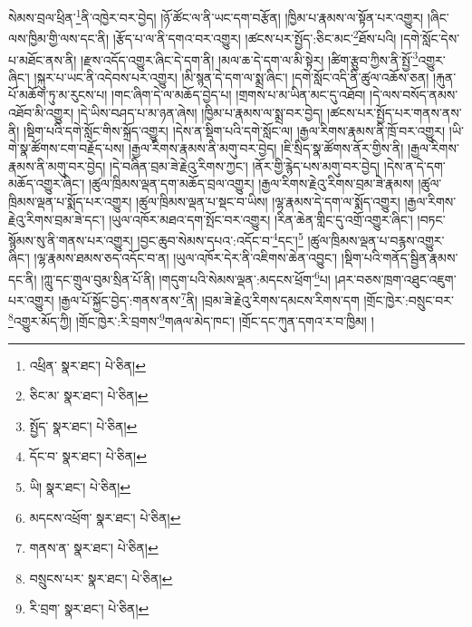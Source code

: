 སེམས་བྲལ་ཕྲིན་\footnote{འཕྲིན་  སྣར་ཐང་།  པེ་ཅིན། }ནི་འཁྱེར་བར་བྱེད། །ཉོ་ཚོང་ལ་ནི་ཡང་དག་བརྩོན། །ཁྱིམ་པ་རྣམས་ལ་སྟོན་པར་འགྱུར། །ཞིང་ལས་ཁྱིམ་གྱི་ལས་དང་ནི། །རྩོད་པ་ལ་ནི་དགའ་བར་འགྱུར། །ཚངས་པར་སྤྱོད་:ཅིང་མང་\footnote{ཅིང་མ་  སྣར་ཐང་།  པེ་ཅིན། }ཐོས་པའི། །དགེ་སློང་དེས་པ་མཐོང་ནས་ནི། །རྫས་འདོད་འགྱུར་ཞིང་དེ་དག་ནི། །མལ་ཆ་དེ་དག་ལ་མི་སྟེར། །ཚིག་རྩུབ་ཀྱིས་ནི་སྤྱོ་\footnote{སྤྱོད་  སྣར་ཐང་།  པེ་ཅིན། }འགྱུར་ཞིང་། །སྐུར་པ་ཡང་ནི་འདེབས་པར་འགྱུར། །མི་སྙན་དེ་དག་ལ་སྨྲ་ཞིང་། །དགེ་སློང་འདི་ནི་ཚུལ་འཆོས་ཅན། །རྐུན་པོ་མཆོག་ཏུ་མ་རུངས་པ། །གང་ཞིག་དེ་ལ་མཆོད་བྱེད་པ། །གྲགས་པ་མ་ཡིན་མང་དུ་འཐོབ། །དེ་ལས་བསོད་ནམས་འཐོབ་མི་འགྱུར། །དེ་ཡིས་བཤད་པ་མ་ཉན་ཞེས། །ཁྱིམ་པ་རྣམས་ལ་སྨྲ་བར་བྱེད། །ཚངས་པར་སྤྱོད་པར་གནས་ནས་ནི། །སྡིག་པའི་དགེ་སློང་གིས་སྐྲོད་འགྱུར། །དེས་ན་སྡིག་པའི་དགེ་སློང་ལ། །རྒྱལ་རིགས་རྣམས་ནི་ཁྲོ་བར་འགྱུར། །ཡི་གེ་སྣ་ཚོགས་ངག་བརྗོད་པས། །རྒྱལ་རིགས་རྣམས་ནི་མགུ་བར་བྱེད། །ཇི་སྲིད་སྣ་ཚོགས་ནོར་གྱིས་ནི། །རྒྱལ་རིགས་རྣམས་ནི་མགུ་བར་བྱེད། །དེ་བཞིན་བྲམ་ཟེ་རྗེའུ་རིགས་ཀྱང་། །ནོར་གྱི་རྙེད་པས་མགུ་བར་བྱེད། །དེས་ན་དེ་དག་མཆོད་འགྱུར་ཞིང་། །ཚུལ་ཁྲིམས་ལྡན་དག་མཆོད་བྲལ་འགྱུར། །རྒྱལ་རིགས་རྗེའུ་རིགས་བྲམ་ཟེ་རྣམས། །ཚུལ་ཁྲིམས་ལྡན་པ་སྨོད་པར་འགྱུར། །ཚུལ་ཁྲིམས་ལྡན་པ་སྡང་བ་ཡིས། །ལྷ་རྣམས་དེ་དག་ལ་སྨོད་འགྱུར། །རྒྱལ་རིགས་རྗེའུ་རིགས་བྲམ་ཟེ་དང་། །ཡུལ་འཁོར་མཐའ་དག་སྤོང་བར་འགྱུར། །རིན་ཆེན་གླིང་དུ་འགྲོ་འགྱུར་ཞིང་། །བཏང་སྙོམས་སུ་ནི་གནས་པར་འགྱུར། །བྱང་ཆུབ་སེམས་དཔའ་:འདོང་བ་\footnote{དོང་བ་  སྣར་ཐང་།  པེ་ཅིན། }དང་།\footnote{ཡི།  སྣར་ཐང་།  པེ་ཅིན། } །ཚུལ་ཁྲིམས་ལྡན་པ་བརྙས་འགྱུར་ཞིང་། །ལྷ་རྣམས་ཐམས་ཅད་འདོང་བ་ན། །ཡུལ་འཁོར་དེར་ནི་འཇིགས་ཆེན་འབྱུང་། །སྡིག་པའི་གནོད་སྦྱིན་རྣམས་དང་ནི། །ཀླུ་དང་གྲུལ་བུམ་སྲིན་པོ་ནི། །གདུག་པའི་སེམས་ལྡན་:མདངས་ཕྲོག་\footnote{མདངས་འཕྲོག་  སྣར་ཐང་།  པེ་ཅིན། }པ། །ཤར་བཅས་ཁྲག་འཐུང་འཇུག་པར་འགྱུར། །རྒྱལ་པོ་སྐྱོང་བྱེད་:གནས་ནས་\footnote{གནས་ན་  སྣར་ཐང་།  པེ་ཅིན། }ནི། །བྲམ་ཟེ་རྗེའུ་རིགས་དམངས་རིགས་དག །གྲོང་ཁྱེར་:བསྲུང་བར་\footnote{བསྲུངས་པར་  སྣར་ཐང་།  པེ་ཅིན། }འགྱུར་མོད་ཀྱི། །གྲོང་ཁྱེར་:རི་བྲགས་\footnote{རི་བྲག་  སྣར་ཐང་།  པེ་ཅིན། }གཞལ་མེད་ཁང་། །གྲོང་དང་ཀུན་དགའ་ར་བ་ཁྱིམ། །
